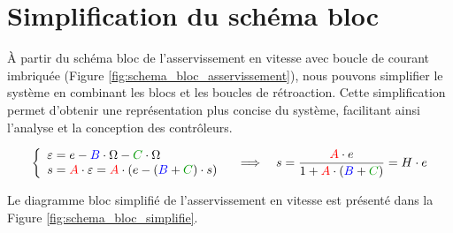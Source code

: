 \section{Simplification du schéma bloc}

À partir du schéma bloc de l'asservissement en vitesse avec boucle de courant imbriquée (Figure \ref{fig:schema_bloc_asservissement}), nous pouvons simplifier le système en combinant les blocs et les boucles de rétroaction. Cette simplification permet d'obtenir une représentation plus concise du système, facilitant ainsi l'analyse et la conception des contrôleurs.

\[
\left\{
\begin{array}{l}
\varepsilon = e - \textcolor{blue}{B} \cdot \Omega - \textcolor{green!60!black}{C} \cdot \Omega \\
s = \textcolor{red}{A} \cdot \varepsilon = \textcolor{red}{A} \cdot \left( e - (\textcolor{blue}{B} + \textcolor{green!60!black}{C}) \cdot s \right)
\end{array}
\right.
\quad \Longrightarrow \quad
s = \frac{\textcolor{red}{A}\cdot e}{1+\textcolor{red}{A} \cdot \left( \textcolor{blue}{B} + \textcolor{green!60!black}{C}\right)} = H \cdot e
\] 

Le diagramme bloc simplifié de l'asservissement en vitesse est présenté dans la Figure \ref{fig:schema_bloc_simplifie}.

